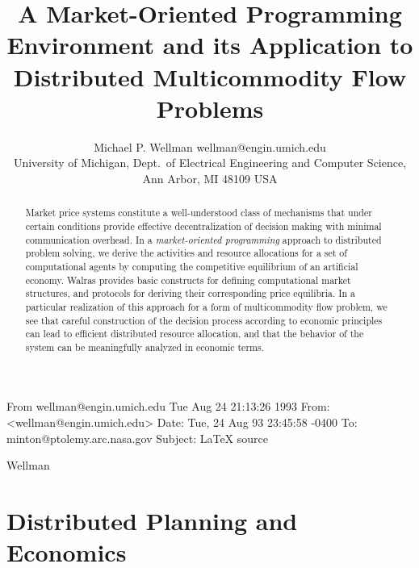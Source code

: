 From wellman@engin.umich.edu Tue Aug 24 21:13:26 1993
From: <wellman@engin.umich.edu>
Date: Tue, 24 Aug 93 23:45:58 -0400
To: minton@ptolemy.arc.nasa.gov
Subject: LaTeX source


\def\epsfsize#1#2{\ifnum#1>\hsize\hsize\else#1\fi}
\def\scaledepsfbox#1#2{\setlength{\hsize}{#2}\epsfbox{#1}}

%
{Wellman}



\title{A Market-Oriented Programming Environment and its Application to
Distributed Multicommodity Flow Problems}

\author{\name Michael P. Wellman \email wellman@engin.umich.edu \\
       \addr University of Michigan,
       Dept.\ of Electrical Engineering and Computer Science,\\
       Ann Arbor, MI 48109 USA}

\maketitle

\begin{abstract}
Market price systems constitute a well-understood class of mechanisms 
that under certain conditions provide effective decentralization of 
decision making with minimal communication overhead.
In a {\em market-oriented programming\/} approach to distributed 
problem solving, we derive the activities and resource allocations for a 
set of computational agents by computing the competitive equilibrium of an 
artificial economy.
{\sc Walras} provides basic constructs for defining computational market 
structures, and protocols for
deriving their corresponding price equilibria.
In a particular realization of this approach for a form of
multicommodity flow problem, we see that careful
construction of the decision process according to economic 
principles can lead to efficient distributed resource allocation, and that
the behavior of the system can be meaningfully analyzed in economic terms.
\end{abstract}

\section{Distributed Planning and Economics}

